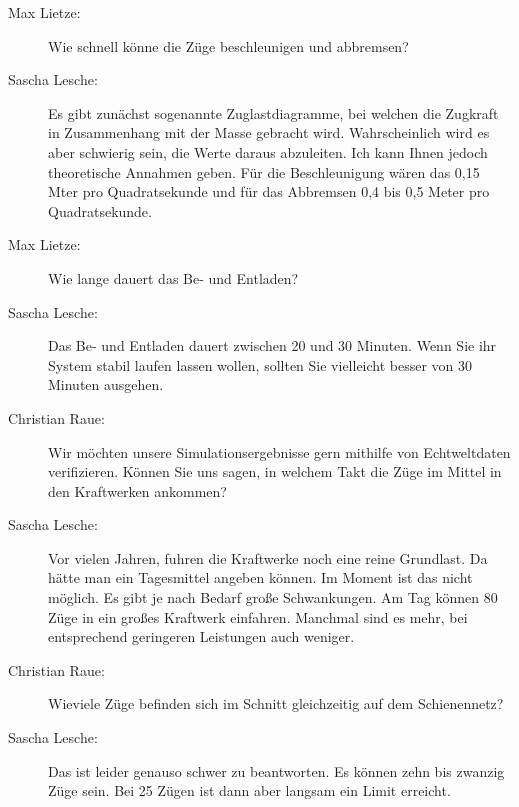 \begin{description}
    \item[Max Lietze:] Wie schnell könne die Züge beschleunigen und abbremsen?

    \item[Sascha Lesche:] Es gibt zunächst sogenannte Zuglastdiagramme, bei welchen die Zugkraft in Zusammenhang mit der Masse gebracht wird. Wahrscheinlich wird es aber schwierig sein, die Werte daraus abzuleiten. Ich kann Ihnen jedoch theoretische Annahmen geben. Für die Beschleunigung wären das 0,15 Mter pro Quadratsekunde und für das Abbremsen 0,4 bis 0,5 Meter pro Quadratsekunde.

    \item[Max Lietze:] Wie lange dauert das Be- und Entladen?

    \item[Sascha Lesche:] Das Be- und Entladen dauert zwischen 20 und 30 Minuten. Wenn Sie ihr System stabil laufen lassen wollen, sollten Sie vielleicht besser von 30 Minuten ausgehen.

    \item[Christian Raue:] Wir möchten unsere Simulationsergebnisse gern mithilfe von Echtweltdaten verifizieren. Können Sie uns sagen, in welchem Takt die Züge im Mittel in den Kraftwerken ankommen?

    \item[Sascha Lesche:] Vor vielen Jahren, fuhren die Kraftwerke noch eine reine Grundlast. Da hätte man ein Tagesmittel angeben können. Im Moment ist das nicht möglich. Es gibt je nach Bedarf große Schwankungen. Am Tag können 80 Züge in ein großes Kraftwerk einfahren. Manchmal sind es mehr, bei entsprechend geringeren Leistungen auch weniger.

    \item[Christian Raue:] Wieviele Züge befinden sich im Schnitt gleichzeitig auf dem Schienennetz?

    \item[Sascha Lesche:] Das ist leider genauso schwer zu beantworten. Es können zehn bis zwanzig Züge sein. Bei 25 Zügen ist dann aber langsam ein Limit erreicht.

\end{description}